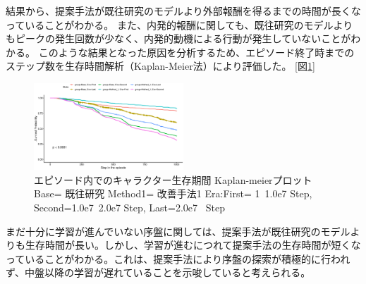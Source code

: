 結果から、提案手法が既往研究のモデルより外部報酬を得るまでの時間が長くなっていることがわかる。
また、内発的報酬に関しても、既往研究のモデルよりもピークの発生回数が少なく、内発的動機による行動が発生していないことがわかる。
このような結果となった原因を分析するため、エピソード終了時までのステップ数を生存時間解析（Kaplan-Meier法）により評価した。
[図\ref{fig7:figure7}]
\begin{figure}[t]
   \centering
   \includegraphics[width=0.5\textwidth]{kaplan_meier_plot.eps}
   \caption{エピソード内でのキャラクター生存期間 Kaplan-meierプロット Base= 既往研究 Method1= 改善手法1 Era:First= 1~1.0e7 Step, Second=1.0e7~2.0e7 Step, Last=2.0e7~ Step}\label{fig7:figure7}
\end{figure}
まだ十分に学習が進んでいない序盤に関しては、提案手法が既往研究のモデルよりも生存時間が長い。しかし、学習が進むにつれて提案手法の生存時間が短くなっていることがわかる。これは、提案手法により序盤の探索が積極的に行われず、中盤以降の学習が遅れていることを示唆していると考えられる。

